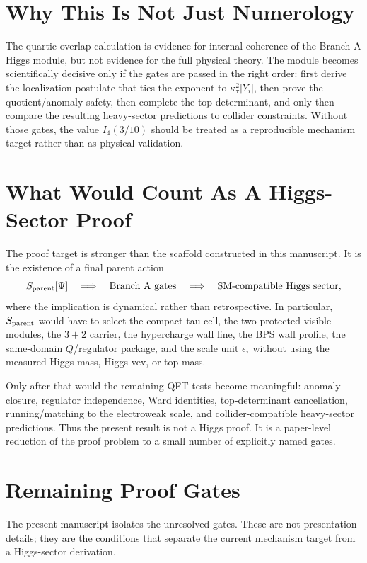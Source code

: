 \documentclass[11pt]{article}
\begin{document}
\section{Why This Is Not Just Numerology}
The quartic-overlap calculation is evidence for internal coherence of the Branch A Higgs module, but not evidence for the full physical theory. The module becomes scientifically decisive only if the gates are passed in the right order: first derive the localization postulate that ties the exponent to $\kappa_\tau^2|Y_i|$, then prove the quotient/anomaly safety, then complete the top determinant, and only then compare the resulting heavy-sector predictions to collider constraints. Without those gates, the value $I_4(3/10)$ should be treated as a reproducible mechanism target rather than as physical validation.

\section{What Would Count As A Higgs-Sector Proof}
The proof target is stronger than the scaffold constructed in this manuscript.
It is the existence of a final parent action
\begin{equation}
S_{\rm parent}[\Psi]
\quad\Longrightarrow\quad
\text{Branch A gates}
\quad\Longrightarrow\quad
\text{SM-compatible Higgs sector},
\end{equation}
where the implication is dynamical rather than retrospective.  In particular,
$S_{\rm parent}$ would have to select the compact tau cell, the two protected
visible modules, the $3+2$ carrier, the hypercharge wall line, the BPS wall
profile, the same-domain $Q$/regulator package, and the scale unit
$\epsilon_\tau$ without using the measured Higgs mass, Higgs vev, or top mass.

Only after that would the remaining QFT tests become meaningful: anomaly
closure, regulator independence, Ward identities, top-determinant cancellation,
running/matching to the electroweak scale, and collider-compatible heavy-sector
predictions.  Thus the present result is not a Higgs proof.  It is a
paper-level reduction of the proof problem to a small number of explicitly
named gates.

\section{Remaining Proof Gates}
The present manuscript isolates the unresolved gates. These are not
presentation details; they are the conditions that separate the current
mechanism target from a Higgs-sector derivation.
\end{document}
